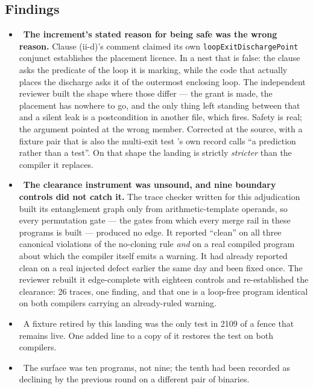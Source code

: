 \subsection*{Findings}
\begin{itemize}
  \item \fdoc\ \textbf{The increment's stated reason for being safe was the wrong reason.} Clause
        (ii-d)'s comment claimed its own \texttt{loopExitDischargePoint} conjunct establishes the
        placement licence. In a nest that is false: the clause asks the predicate of the loop it is
        marking, while the code that actually places the discharge asks it of the outermost enclosing
        loop. The independent reviewer built the shape where those differ --- the grant is made, the
        placement has nowhere to go, and the only thing left standing between that and a silent leak
        is a postcondition in another file, which fires. Safety is real; the argument pointed at the
        wrong member. Corrected at the source, with a fixture pair that is also the multi-exit test
        's own record calls ``a prediction rather than a test''. On that shape the landing
        is strictly \emph{stricter} than the compiler it replaces.
  \item \fconfirmed\ \textbf{The clearance instrument was unsound, and nine boundary controls did not
        catch it.} The trace checker written for this adjudication built its entanglement graph only
        from arithmetic-template operands, so every permutation gate --- the gates from which every
        merge rail in these programs is built --- produced no edge. It reported ``clean'' on all three
        canonical violations of the no-cloning rule \emph{and} on a real compiled program about which
        the compiler itself emits a warning. It had already reported clean on a real injected defect
        earlier the same day and been fixed once. The reviewer rebuilt it edge-complete with eighteen
        controls and re-established the clearance: 26 traces, one finding, and that one is a loop-free
        program identical on both compilers carrying an already-ruled warning.
  \item \fpreexisting\ A fixture retired by this landing was the only test in 2109 of a fence that
        remains live. One added line to a copy of it restores the test on both compilers.
  \item \foverdecline\ The surface was ten programs, not nine; the tenth had been recorded as
        declining by the previous round on a different pair of binaries.
\end{itemize}

